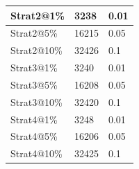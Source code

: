 \begin{figure}[!t]
\begin{minipage}[t]{0.495\columnwidth}
\begin{minipage}[t]{1.0\columnwidth}
\begin{minipage}[t]{1.0\columnwidth}
{\begin{tabular}{|l|l|l|}
Strat2@1\%                                                   & 3238                                                   & 0.01                                                    \\ \hline
Strat2@5\%                                                   & 16215                                                  & 0.05                                                    \\ \hline
Strat2@10\%                                                  & 32426                                                  & 0.1                                                     \\ \hline
Strat3@1\%                                                   & 3240                                                   & 0.01                                                    \\ \hline
Strat3@5\%                                                   & 16208                                                  & 0.05                                                    \\ \hline
Strat3@10\%                                                  & 32420                                                  & 0.1                                                     \\ \hline
Strat4@1\%                                                   & 3248                                                   & 0.01                                                    \\ \hline
Strat4@5\%                                                   & 16206                                                  & 0.05                                                    \\ \hline
Strat4@10\%                                                  & 32425                                                  & 0.1                                                     \\ \hline
\end{tabular}
}


\end{minipage}
\end{minipage}
\end{minipage}
\end{figure}
